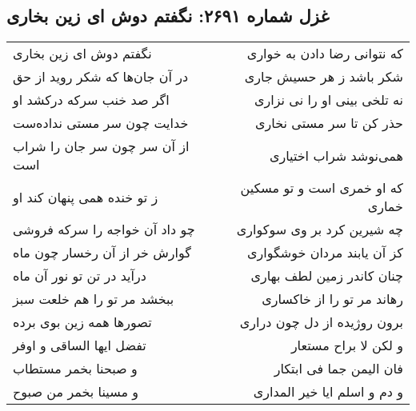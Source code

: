 \begin{center}
\section*{غزل شماره ۲۶۹۱: نگفتم دوش ای زین بخاری}
\label{sec:2691}
\begin{longtable}{l p{0.5cm} r}
نگفتم دوش ای زین بخاری
&&
که نتوانی رضا دادن به خواری
\\
در آن جان‌ها که شکر روید از حق
&&
شکر باشد ز هر حسیش جاری
\\
اگر صد خنب سرکه درکشد او
&&
نه تلخی بینی او را نی نزاری
\\
خدایت چون سر مستی نداده‌ست
&&
حذر کن تا سر مستی نخاری
\\
از آن سر چون سر جان را شراب است
&&
همی‌نوشد شراب اختیاری
\\
ز تو خنده همی پنهان کند او
&&
که او خمری است و تو مسکین خماری
\\
چو داد آن خواجه را سرکه فروشی
&&
چه شیرین کرد بر وی سوکواری
\\
گوارش خر از آن رخسار چون ماه
&&
کز آن یابند مردان خوشگواری
\\
درآید در تن تو نور آن ماه
&&
چنان کاندر زمین لطف بهاری
\\
ببخشد مر تو را هم خلعت سبز
&&
رهاند مر تو را از خاکساری
\\
تصورها همه زین بوی برده
&&
برون روژیده از دل چون دراری
\\
تفضل ایها الساقی و اوفر
&&
و لکن لا براح مستعار
\\
و صبحنا بخمر مستطاب
&&
فان الیمن جما فی ابتکار
\\
و مسینا بخمر من صبوح
&&
و دم و اسلم ایا خیر المداری
\\
\end{longtable}
\end{center}
